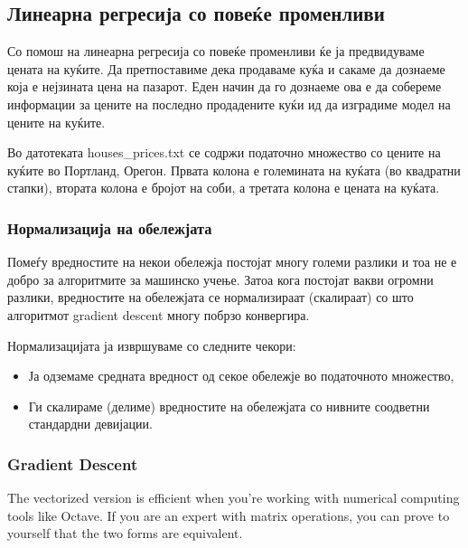 \documentclass[12pt,a4paper]{article}
\begin{document}
\subsection{Линеарна регресија со повеќе променливи}

Со помош на линеарна регресија со повеќе променливи ќе ја предвидуваме цената на
куќите. Да претпоставиме дека продаваме куќа и сакаме да дознаеме која е
нејзината цена на пазарот. Еден начин да го дознаеме ова е да собереме
информации за цените на последно продадените куќи ид да изградиме модел на
цените на куќите.

Во датотеката houses\_prices.txt се содржи податочно множество со цените на
куќите во Портланд, Орегон. Првата колона е големината на куќата (во квадратни
стапки), втората колона е бројот на соби, а третата колона е цената на куќата.

\subsubsection{Нормализација на обележјата}

Помеѓу вредностите на некои обележја постојат многу големи разлики и тоа не е
добро за алгоритмите за машинско учење. Затоа кога постојат вакви огромни
разлики, вредностите на обележјата се нормализираат (скалираат) со што
алгоритмот gradient descent многу побрзо конвергира. 

Нормализацијата ја извршуваме со следните чекори:
\begin{itemize}
  \item Ја одземаме средната вредност од секое обележје во податочното
  множество,
  \item Ги скалираме (делиме) вредностите на обележјата со нивните соодветни
  стандардни девијации.
\end{itemize}




\subsubsection{Gradient Descent}




The vectorized version is efficient when you’re working with numerical
computing tools like Octave. If you are an expert with matrix operations,
you can prove to yourself that the two forms are equivalent.
\end{document}
